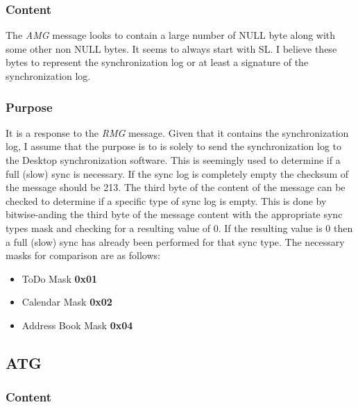             \subsubsection{Content}

            The \emph{AMG} message looks to contain a large number of NULL
            byte along with some other non NULL bytes. It seems to always
            start with SL. I believe these bytes to represent the
            synchronization log or at least a signature of the synchronization
            log.

            \subsubsection{Purpose}

            It is a response to the \emph{RMG} message. Given that it contains
            the synchronization log, I assume that the purpose is to is solely
            to send the synchronization log to the Desktop synchronization
            software. This is seemingly used to determine if a full
            (slow) sync is necessary. If the sync log is completely
            empty the checksum of the message should be 213. The third
            byte of the content of the message can be checked to
            determine if a specific type of sync log is empty. This is
            done by bitwise-anding the third byte of the message content
            with the appropriate sync types mask and checking for a
            resulting value of 0. If the resulting value is 0 then a
            full (slow) sync has already been performed for that sync
            type. The necessary masks for comparison are as follows:

            \begin{itemize}
            \item ToDo Mask \textbf{0x01}
            \item Calendar Mask \textbf{0x02}
            \item Address Book Mask \textbf{0x04}
            \end{itemize}

        \subsection{ATG}

            \subsubsection{Content}

